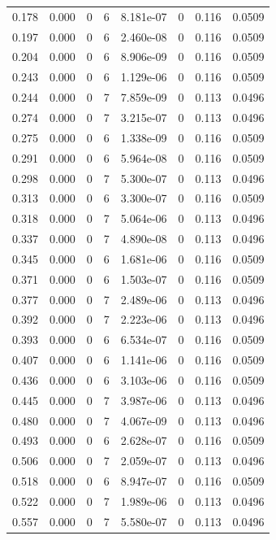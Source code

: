 \documentclass[preview]{standalone}
\begin{document}
{{\begin{tabular}{L{1.2cm}C{1.2cm} C{0.3cm}C{0.5cm} C{1.4cm}C{1.4cm} C{1.4cm}C{1.4cm}}
  0.178  &  0.000  & 0     &  6 &  8.181e-07  & 0  & 0.116 &  0.0509   \\ 
  0.197  &  0.000  & 0     &  6 &  2.460e-08  & 0  & 0.116 &  0.0509   \\ 
  0.204  &  0.000  & 0     &  6 &  8.906e-09  & 0  & 0.116 &  0.0509   \\ 
  0.243  &  0.000  & 0     &  6 &  1.129e-06  & 0  & 0.116 &  0.0509   \\ 
  0.244  &  0.000  & 0     &  7 &  7.859e-09  & 0  & 0.113 &  0.0496   \\ 
  0.274  &  0.000  & 0     &  7 &  3.215e-07  & 0  & 0.113 &  0.0496   \\ 
  0.275  &  0.000  & 0     &  6 &  1.338e-09  & 0  & 0.116 &  0.0509   \\ 
  0.291  &  0.000  & 0     &  6 &  5.964e-08  & 0  & 0.116 &  0.0509   \\ 
  0.298  &  0.000  & 0     &  7 &  5.300e-07  & 0  & 0.113 &  0.0496   \\ 
  0.313  &  0.000  & 0     &  6 &  3.300e-07  & 0  & 0.116 &  0.0509   \\ 
  0.318  &  0.000  & 0     &  7 &  5.064e-06  & 0  & 0.113 &  0.0496   \\ 
  0.337  &  0.000  & 0     &  7 &  4.890e-08  & 0  & 0.113 &  0.0496   \\ 
  0.345  &  0.000  & 0     &  6 &  1.681e-06  & 0  & 0.116 &  0.0509   \\ 
  0.371  &  0.000  & 0     &  6 &  1.503e-07  & 0  & 0.116 &  0.0509   \\ 
  0.377  &  0.000  & 0     &  7 &  2.489e-06  & 0  & 0.113 &  0.0496   \\ 
  0.392  &  0.000  & 0     &  7 &  2.223e-06  & 0  & 0.113 &  0.0496   \\ 
  0.393  &  0.000  & 0     &  6 &  6.534e-07  & 0  & 0.116 &  0.0509   \\ 
  0.407  &  0.000  & 0     &  6 &  1.141e-06  & 0  & 0.116 &  0.0509   \\ 
  0.436  &  0.000  & 0     &  6 &  3.103e-06  & 0  & 0.116 &  0.0509   \\ 
  0.445  &  0.000  & 0     &  7 &  3.987e-06  & 0  & 0.113 &  0.0496   \\ 
  0.480  &  0.000  & 0     &  7 &  4.067e-09  & 0  & 0.113 &  0.0496   \\ 
  0.493  &  0.000  & 0     &  6 &  2.628e-07  & 0  & 0.116 &  0.0509   \\ 
  0.506  &  0.000  & 0     &  7 &  2.059e-07  & 0  & 0.113 &  0.0496   \\ 
  0.518  &  0.000  & 0     &  6 &  8.947e-07  & 0  & 0.116 &  0.0509   \\ 
  0.522  &  0.000  & 0     &  7 &  1.989e-06  & 0  & 0.113 &  0.0496   \\ 
  0.557  &  0.000  & 0     &  7 &  5.580e-07  & 0  & 0.113 &  0.0496   \\ 
\hline 
\end{tabular} 

}}
\end{document}

